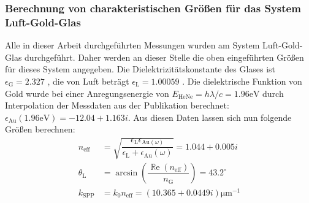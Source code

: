 \documentclass[titlepage]{article}
\renewcommand{\Re}{\operatorname{\mathbb{R}e}}
\begin{document}
	\subsubsection{Berechnung von charakteristischen Größen für das System Luft-Gold-Glas}
	Alle in dieser Arbeit durchgeführten Messungen wurden am System Luft-Gold-Glas durchgeführt. Daher werden an dieser Stelle die oben eingeführten Größen für dieses System angegeben. Die Dielektrizitätskonstante des Glases ist $\epsilon_{\mathrm{G}} = 2.327$ \cite{Zeiss.}, die von Luft beträgt $\epsilon_{\mathrm{L}} = 1.00059$ \cite{Hippel.1995}. Die dielektrische Funktion von Gold wurde bei einer Anregungsenergie von $E_{\mathrm{HeNe}} = h\lambda/c = 1.96\mathrm{eV} $ durch Interpolation der Messdaten aus der Publikation \cite{Olmon.2012} berechnet: $\epsilon_{\mathrm{Au}}(1.96\mathrm{eV}) = -12.04 +1.163i$. Aus diesen Daten lassen sich nun folgende Größen berechnen:
	\begin{subequations}
		\begin{align}
			n_{\mathrm{eff}} &= \sqrt{\dfrac{\epsilon_{\mathrm{L}}\epsilon_{\mathrm{Au}(\omega)}}{\epsilon_{\mathrm{L}} + 	\epsilon_{\mathrm{Au}}(\omega)}} = 	1.044 + 0.005i \label{eq:theo_n_eff}\\			
			\theta_\mathrm{L} &=  \arcsin\left(\dfrac{\Re(n_{\mathrm{eff}})}{ n_\mathrm{G}}\right) = 43.2^\circ 
			\label{eq:theo_theta_l}\\
			k_{\mathrm{SPP}} &= k_0 n_{\mathrm{eff}} = (10.365 + 0.0449i)\mathrm{\mu m}^{-1}\label{eq:theo_k_spp}
		\end{align}
	\end{subequations}
\end{document}
